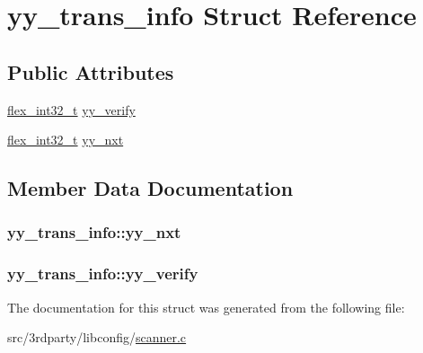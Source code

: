 \hypertarget{structyy__trans__info}{
\section{yy\_\-trans\_\-info Struct Reference}
\label{structyy__trans__info}
}
\subsection*{Public Attributes}
\begin{DoxyCompactItemize}
\item 
\hyperlink{scanner_8c_a838ce943cf44ef7769480714fc6c3ba9}{flex\_\-int32\_\-t} \hyperlink{structyy__trans__info_a5c9f61e770deef50bd4e697310342fe9}{yy\_\-verify}
\item 
\hyperlink{scanner_8c_a838ce943cf44ef7769480714fc6c3ba9}{flex\_\-int32\_\-t} \hyperlink{structyy__trans__info_ae0715250c2bef261e596e77e0030f13e}{yy\_\-nxt}
\end{DoxyCompactItemize}


\subsection{Member Data Documentation}
\hypertarget{structyy__trans__info_ae0715250c2bef261e596e77e0030f13e}{
\subsubsection[{yy\_\-nxt}]{ {\bf yy\_\-trans\_\-info::yy\_\-nxt}}}
\label{structyy__trans__info_ae0715250c2bef261e596e77e0030f13e}
\hypertarget{structyy__trans__info_a5c9f61e770deef50bd4e697310342fe9}{
\subsubsection[{yy\_\-verify}]{ {\bf yy\_\-trans\_\-info::yy\_\-verify}}}
\label{structyy__trans__info_a5c9f61e770deef50bd4e697310342fe9}


The documentation for this struct was generated from the following file:\begin{DoxyCompactItemize}
\item 
src/3rdparty/libconfig/\hyperlink{scanner_8c}{scanner.c}\end{DoxyCompactItemize}
